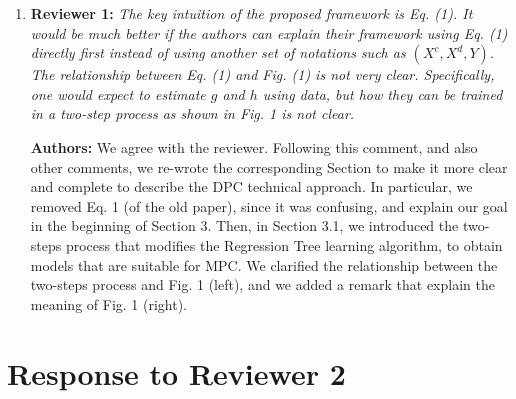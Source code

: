 \documentclass{article}
\begin{document}
\begin{enumerate}
\item \textbf{Reviewer 1:} \textit{The key intuition of the proposed framework is Eq. (1). It would be much better if the authors can explain their framework using Eq. (1) directly first instead of using another set of notations such as $(X^c, X^d, Y)$. The relationship between Eq. (1) and Fig. (1) is not very clear. Specifically, one would expect to estimate $g$ and $h$ using data, but how they can be trained in a two-step process as shown in Fig. 1 is not clear.}

\textbf{Authors:} We agree with the reviewer. Following this comment, and also other comments, we re-wrote the corresponding Section to make it more clear and complete to describe the DPC technical approach. In particular, we removed Eq. 1 (of the old paper), since it was confusing, and explain our goal in the beginning of Section 3. Then, in Section 3.1, we introduced the two-steps process that modifies the Regression Tree learning algorithm, to obtain models that are suitable for MPC. We clarified the relationship between the two-steps process and Fig. 1 (left), and we added a remark that explain the meaning of Fig. 1 (right). 

\end{enumerate}

\section{Response to Reviewer 2}
\end{document}
